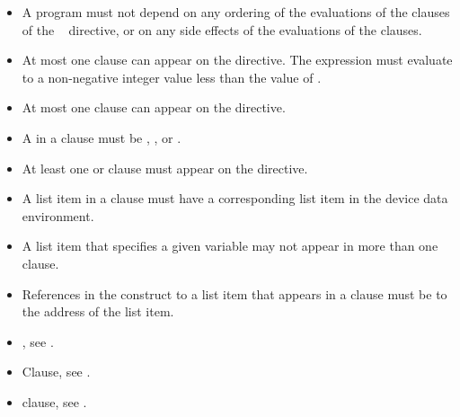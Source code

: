 \restrictions
\begin{itemize}
    \item A program must not depend on any ordering of the evaluations of the clauses of the
    ~ directive, or on any side effects of the evaluations of the clauses.

  \item At most one  clause can appear on the directive. The  expression
    must evaluate to a non-negative integer value less than the value
    of .

  \item At most one  clause can appear on the directive.
  \item A  in a  clause must be , ,  or .
  \item At least one  or  clause must appear on the directive.


  \item A list item in a  clause must have a
    corresponding list item in the device data environment.

  \item A list item that specifies a given variable may not appear in more than
	  one  clause.

  \item References in the construct to a list item that appears in a
     clause must be to the address of the list item.
\end{itemize}

\crossreferences
\begin{itemize}
\item {}, see 
. 

\item {} Clause, see .

\item {} clause, see 
.
\end{itemize}










